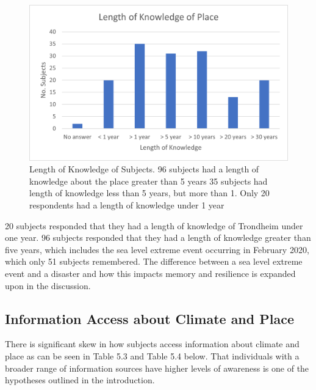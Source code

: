 \begin{figure}[H]
    \centering
    \includegraphics{fig_results/long_know.png}
    \caption{Length of Knowledge of Subjects. 96 subjects had a length of knowledge about the place greater than 5 years 35 subjects had length of knowledge less than 5 years, but more than 1. Only 20 respondents had a length of knowledge under 1 year}
    \label{fig:long_know}
\end{figure}

20 subjects responded that they had a length of knowledge of Trondheim under one year. 96 subjects responded that they had a length of knowledge greater than five years, which includes the sea level extreme event occurring in February 2020, which only 51 subjects remembered. The difference between a sea level extreme event and a disaster and how this impacts memory and resilience is expanded upon in the discussion.


\subsection{Information Access about Climate and Place}
There is significant skew in how subjects access information about climate and place as can be seen in Table 5.3 and Table 5.4 below. That individuals with a broader range of information sources have higher levels of awareness is one of the hypotheses outlined in the introduction. 

